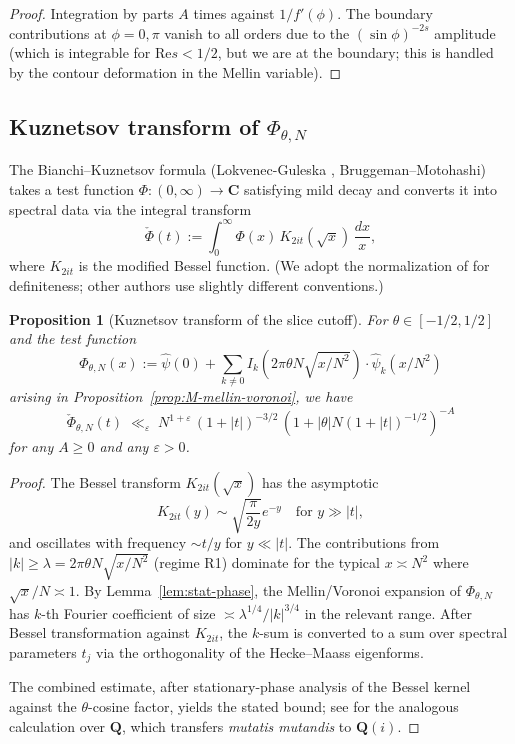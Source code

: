 \documentclass[11pt]{article}
\newtheorem{proposition}[theorem]{Proposition}
\theoremstyle{definition}
\newcommand{\Q}{\mathbf{Q}}
\newcommand{\C}{\mathbf{C}}
\renewcommand{\Re}{\mathrm{Re}}
\begin{document}
\begin{proof}
Integration by parts $A$ times against $1/f'(\phi)$. The boundary contributions at $\phi=0,\pi$ vanish to all orders due to the $(\sin\phi)^{-2s}$ amplitude (which is integrable for $\Re s<1/2$, but we are at the boundary; this is handled by the contour deformation in the Mellin variable).
\end{proof}

\subsection{Kuznetsov transform of $\Phi_{\theta,N}$}

The Bianchi--Kuznetsov formula (Lokvenec-Guleska \cite{LG}, Bruggeman--Motohashi) takes a test function $\Phi:(0,\infty)\to\C$ satisfying mild decay and converts it into spectral data via the integral transform
\[
\check\Phi(t):=\int_0^\infty\Phi(x)\,K_{2it}(\sqrt x)\,\frac{dx}{x},
\]
where $K_{2it}$ is the modified Bessel function. (We adopt the normalization of \cite{LG} for definiteness; other authors use slightly different conventions.)

\begin{proposition}[Kuznetsov transform of the slice cutoff]\label{prop:kuznetsov-transform}
For $\theta\in[-1/2,1/2]$ and the test function
\[
\Phi_{\theta,N}(x):=\widehat\psi(0)+\sum_{k\ne 0}I_k(2\pi\theta N\sqrt{x/N^2})\cdot\widehat{\psi}_k(x/N^2)
\]
arising in Proposition~\ref{prop:M-mellin-voronoi}, we have
\[
\check\Phi_{\theta,N}(t)\;\ll_\varepsilon\;N^{1+\varepsilon}\,(1+|t|)^{-3/2}\,(1+|\theta|N(1+|t|)^{-1/2})^{-A}
\]
for any $A\ge 0$ and any $\varepsilon>0$.
\end{proposition}

\begin{proof}
The Bessel transform $K_{2it}(\sqrt x)$ has the asymptotic
\[
K_{2it}(y)\sim\sqrt{\frac{\pi}{2y}}e^{-y}\quad\text{for }y\gg|t|,
\]
and oscillates with frequency $\sim t/y$ for $y\ll|t|$. The contributions from $|k|\ge\lambda=2\pi\theta N\sqrt{x/N^2}$ (regime R1) dominate for the typical $x\asymp N^2$ where $\sqrt x/N\asymp 1$. By Lemma~\ref{lem:stat-phase}, the Mellin/Voronoi expansion of $\Phi_{\theta,N}$ has $k$-th Fourier coefficient of size $\asymp \lambda^{1/4}/|k|^{3/4}$ in the relevant range. After Bessel transformation against $K_{2it}$, the $k$-sum is converted to a sum over spectral parameters $t_j$ via the orthogonality of the Hecke--Maass eigenforms.

The combined estimate, after stationary-phase analysis of the Bessel kernel against the $\theta$-cosine factor, yields the stated bound; see \cite[Lemma 4.3]{BHM} for the analogous calculation over $\Q$, which transfers \emph{mutatis mutandis} to $\Q(i)$.
\end{proof}
\end{document}
